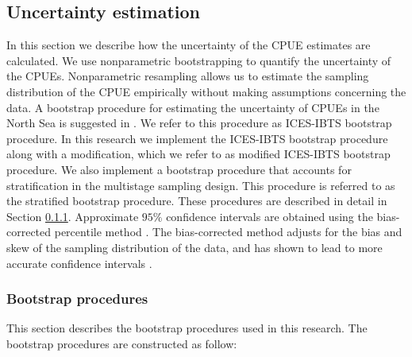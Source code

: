 \documentclass[a4paper 12pt]{article}
\numberwithin{equation}{section}
\newcommand{\ed}[1]{\textcolor{red}{#1}}
\begin{document}
\subsection{Uncertainty estimation}
\label{sec:uncertaintyestimation}
In this section we describe how the uncertainty of the CPUE estimates are calculated. We use nonparametric bootstrapping to quantify the uncertainty of the CPUEs. Nonparametric resampling allows us to estimate the sampling distribution of the CPUE empirically without making assumptions concerning the data. A bootstrap procedure for estimating the uncertainty of CPUEs in the North Sea is suggested in \citet{ICES2006Report}. We refer to this procedure as ICES-IBTS bootstrap procedure. In this research we implement the ICES-IBTS bootstrap procedure along with a modification, which we refer to as modified ICES-IBTS bootstrap procedure. We also implement a bootstrap procedure that accounts for stratification in the multistage sampling design. This procedure is referred to as the stratified bootstrap procedure. These procedures are described in detail in Section \ref{sec:datrasstratifiedbootstrap}. Approximate $95\%$ confidence intervals are obtained using the bias-corrected percentile method  \citep{gavaris2002statistical, magnusson2013measuring}. The bias-corrected method adjusts for the bias and skew of the sampling distribution of the data, and has shown to lead to more accurate confidence intervals   \citep{efron2003second,restrepo2000different}. 

\subsubsection{Bootstrap procedures}
\label{sec:datrasstratifiedbootstrap}
This section describes the bootstrap procedures used in this research. The bootstrap procedures are constructed as follow:

\end{document}
